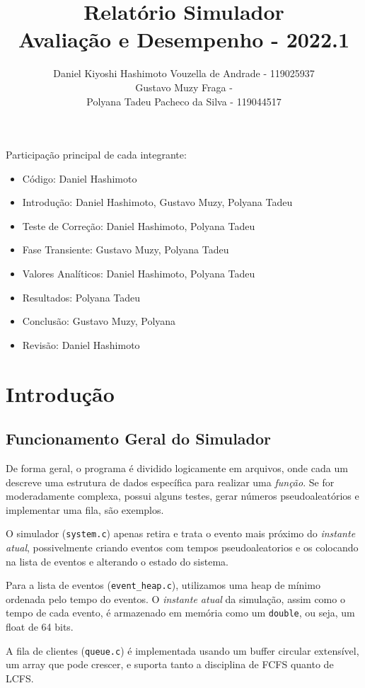 \documentclass[a4paper]{article}
\title{Relatório Simulador\\
  Avaliação e Desempenho - 2022.1}
\author{Daniel Kiyoshi Hashimoto Vouzella de Andrade - 119025937
  \\
Gustavo Muzy Fraga -
  \\
Polyana Tadeu Pacheco da Silva - 119044517
}
\date{}
\newcommand{\arq}{\texttt}
\newcommand{\inlcode}{\texttt}
\begin{document}
\maketitle

\vfill

Participação principal de cada integrante:
\begin{itemize}
    \item \large Código:
    \hfill Daniel Hashimoto
    \item \large Introdução:
    \hfill Daniel Hashimoto, Gustavo Muzy, Polyana Tadeu
    \item \large Teste de Correção:
    \hfill Daniel Hashimoto, Polyana Tadeu
    \item \large Fase Transiente:
    \hfill Gustavo Muzy, Polyana Tadeu
    \item \large Valores Analíticos:
    \hfill Daniel Hashimoto, Polyana Tadeu
    \item \large Resultados:
    \hfill Polyana Tadeu
    \item \large Conclusão:
    \hfill Gustavo Muzy, Polyana
    \item \large Revisão:
    \hfill Daniel Hashimoto
\end{itemize}

\newpage
\section{Introdução}
\subsection{Funcionamento Geral do Simulador}
De forma geral,
o programa é dividido logicamente em arquivos,
onde cada um descreve uma estrutura de dados
específica para realizar uma \emph{função}.
Se for moderadamente complexa, possui alguns testes,
gerar números pseudoaleatórios e implementar uma fila,
são exemplos.

O simulador (\arq{system.c})
apenas retira e trata o evento mais próximo do \emph{instante atual},
possivelmente criando eventos com tempos pseudoaleatorios
e os colocando na lista de eventos e alterando o estado do sistema.

Para a lista de eventos (\arq{event\_heap.c}),
utilizamos uma heap de mínimo ordenada pelo tempo do eventos.
O \emph{instante atual} da simulação,
assim como o tempo de cada evento,
é armazenado em memória como um \inlcode{double}, ou seja,
um float de 64 bits.

A fila de clientes (\arq{queue.c})
é implementada usando um buffer circular extensível,
um array que pode crescer,
e suporta tanto a disciplina de FCFS quanto de LCFS.
\end{document}
